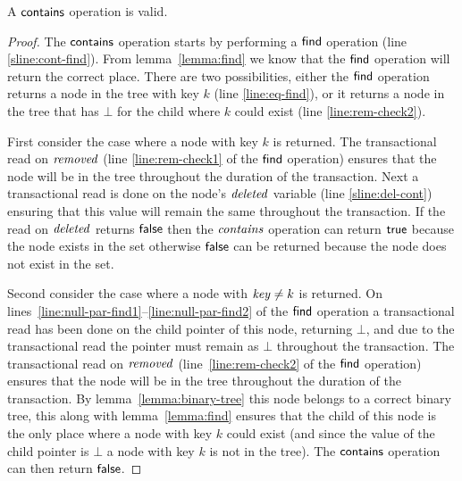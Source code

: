 \begin{theorem}
\label{theorem:contains-valid}
A $\act{contains}$ operation is valid.
\end{theorem}
\begin{proof}
The $\act{contains}$ operation starts by performing a $\act{find}$ operation (line \ref{sline:cont-find}).
From lemma~\ref{lemma:find} we know that the $\act{find}$ operation will return the correct place.
There are two possibilities, either the $\act{find}$ operation returns a node in the tree with key $k$ (line \ref{line:eq-find}),
or it returns a node in the tree that has $\bot$ for the child where $k$ could exist (line \ref{line:rem-check2}).

First consider the case where a node with key $k$ is returned.
The transactional read on $\ms{removed}$ (line \ref{line:rem-check1} of the $\act{find}$ operation) ensures that the node will be in the tree throughout the duration of the transaction.
Next a transactional read is done on the node's $\ms{deleted}$ variable (line \ref{sline:del-cont}) ensuring that this value will remain the same throughout the transaction.
If the read on $\ms{deleted}$ returns $\lit{false}$ then the $\ms{contains}$ operation can return $\lit{true}$ because the node exists in the set
otherwise $\lit{false}$ can be returned because the node does not exist in the set.

Second consider the case where a node with $\ms{key} \neq k$ is returned.
On lines~\ref{line:null-par-find1}--\ref{line:null-par-find2} of the $\act{find}$ operation a transactional read has been done on the child pointer of this node, returning $\bot$, and due to the transactional read the pointer must remain as $\bot$
throughout the transaction.
The transactional read on $\ms{removed}$ (line~\ref{line:rem-check2} of the $\act{find}$ operation) ensures that the node will be in the tree throughout the duration of the transaction.
By lemma~\ref{lemma:binary-tree} this node belongs to a correct binary tree, this along with lemma~\ref{lemma:find} ensures that the child of this node is the only place where a node with key $k$ could exist
(and since the value of the child pointer is $\bot$ a node with key $k$ is not in the tree).
The $\act{contains}$ operation can then return $\lit{false}$.
\end{proof}



